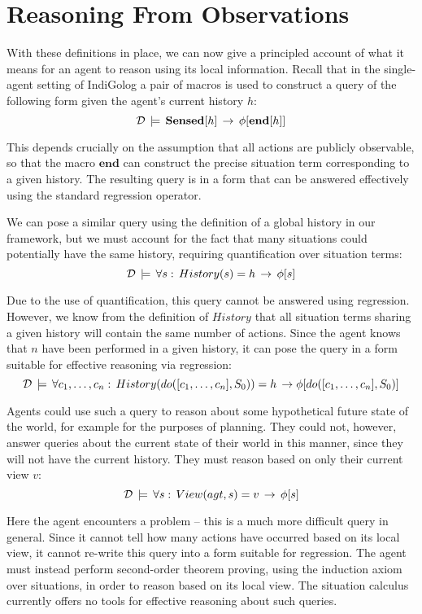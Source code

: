 \section{Reasoning From Observations\label{sec:Observations:Reasoning}}

With these definitions in place, we can now give a principled account
of what it means for an agent to reason using its local information.
Recall that in the single-agent setting of IndiGolog \citep{giacomo99indigolog}
a pair of macros is used to construct a query of the following form
given the agent's current history $h$:\[
\mathcal{D}\,\models\,\mathbf{Sensed}[h]\,\rightarrow\,\phi[\mathbf{end}[h]]\]


This depends crucially on the assumption that all actions are publicly
observable, so that the macro $\mathbf{end}$ can construct the precise
situation term corresponding to a given history. The resulting query
is in a form that can be answered effectively using the standard regression
operator.

We can pose a similar query using the definition of a global history
in our framework, but we must account for the fact that many situations
could potentially have the same history, requiring quantification
over situation terms:\[
\mathcal{D}\,\models\,\forall s:\, History(s)=h\,\rightarrow\,\phi[s]\]


Due to the use of quantification, this query cannot be answered using
regression. However, we know from the definition of $History$ that
all situation terms sharing a given history will contain the same
number of actions. Since the agent knows that $n$ have been performed
in a given history, it can pose the query in a form suitable for effective
reasoning via regression:\[
\mathcal{D}\,\models\,\forall c_{1},\dots,c_{n}:\, History(do([c_{1},\dots,c_{n}],S_{0}))=h\,\rightarrow\phi[do([c_{1},\dots,c_{n}],S_{0})]\]


Agents could use such a query to reason about some hypothetical future
state of the world, for example for the purposes of planning. They
could not, however, answer queries about the current state of their
world in this manner, since they will not have the current history.
 They must reason based on only their current view $v$:\[
\mathcal{D}\,\models\,\forall s:\, View(agt,s)=v\,\rightarrow\,\phi[s]\]


Here the agent encounters a problem -- this is a much more difficult
query in general. Since it cannot tell how many actions have occurred
based on its local view, it cannot re-write this query into a form
suitable for regression. The agent must instead perform second-order
theorem proving, using the induction axiom over situations, in order
to reason based on its local view. The situation calculus currently
offers no tools for effective reasoning about such queries.

